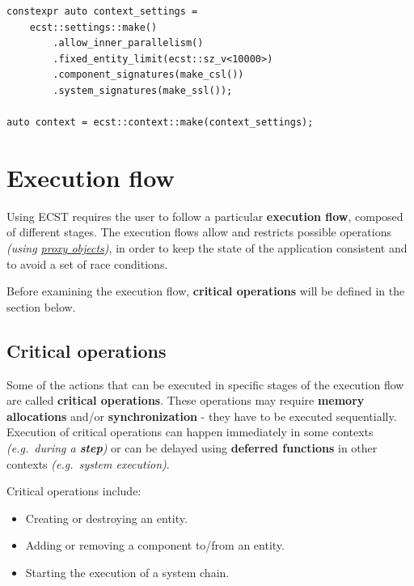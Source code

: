 \documentclass[twoside, 12pt, a4paper, openany]{book}
\begin{document}
\begin{verbatim}
constexpr auto context_settings =
    ecst::settings::make()
        .allow_inner_parallelism()
        .fixed_entity_limit(ecst::sz_v<10000>)
        .component_signatures(make_csl())
        .system_signatures(make_ssl());

auto context = ecst::context::make(context_settings);
\end{verbatim}

\hypertarget{chap_flow}{\chapter{Execution flow}\label{chap_flow}}

Using ECST requires the user to follow a particular \textbf{execution
flow}, composed of different stages. The execution flows allow and
restricts possible operations \emph{(using
\protect\hyperlink{chap_proxies}{proxy objects})}, in order to keep the
state of the application consistent and to avoid a set of race
conditions.

Before examining the execution flow, \textbf{critical operations} will
be defined in the section below.

\section{Critical operations}\label{critical-operations}

Some of the actions that can be executed in specific stages of the
execution flow are called \textbf{critical operations}. These operations
may require \textbf{memory allocations} and/or \textbf{synchronization}
- they have to be executed sequentially. Execution of critical
operations can happen immediately in some contexts \emph{(e.g.~during a
\textbf{step})} or can be delayed using \textbf{deferred functions} in
other contexts \emph{(e.g.~system execution)}.

Critical operations include:

\begin{itemize}
\item
  Creating or destroying an entity.
\item
  Adding or removing a component to/from an entity.
\item
  Starting the execution of a system chain.
\end{itemize}
\end{document}
